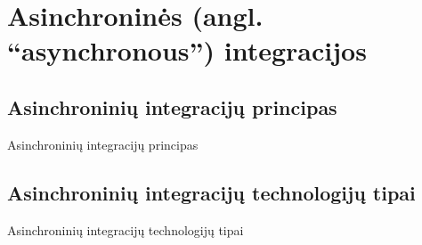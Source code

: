 \section{Asinchroninės (angl. “asynchronous”) integracijos}

\subsection{Asinchroninių integracijų principas}
Asinchroninių integracijų principas
\subsection{Asinchroninių integracijų technologijų tipai}
Asinchroninių integracijų technologijų tipai